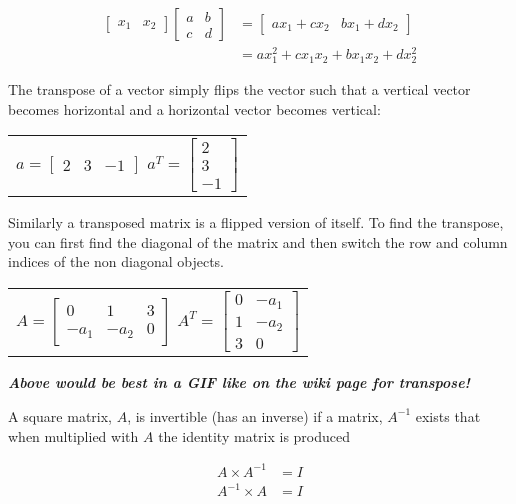\documentclass[a4paper]{article}
\begin{document}
\begin{align*}
  \begin{bmatrix}
    x_1 & x_2
  \end{bmatrix}
  \begin{bmatrix}
    a & b\\
    c & d
  \end{bmatrix} &= \begin{bmatrix}
    ax_1+cx_2 & bx_1+dx_2
  \end{bmatrix}\\
  &= ax_1^2+cx_1x_2+bx_1x_2+dx_2^2
\end{align*}

The transpose of a vector simply flips the vector such that a vertical vector becomes horizontal and a horizontal vector becomes vertical:
\begin{center}
\begin{tabular}{c}
$a = \begin{bmatrix}
      2 & 3 & -1
      \end{bmatrix}$
$a^T = \begin{bmatrix}
        2\\
        3 \\
        -1
        \end{bmatrix}$
\end{tabular}
\end{center}
Similarly a transposed matrix is a flipped version of itself. To find the transpose, you can first find the diagonal of the matrix and then switch the row and column indices of the non diagonal objects.
\begin{center}
\begin{tabular}{c}
 $A = \begin{bmatrix}
       0 & 1 & 3\\
       -a_1 & -a_2 & 0
       \end{bmatrix}$
 $ A^T = \begin{bmatrix}
         0 & -a_1\\
         1 & -a_2\\
         3 & 0
         \end{bmatrix}$
 \end{tabular}               
\end{center}

\textbf{\textit{Above would be best in a GIF like on the wiki page for transpose!}}

A square matrix, $A$, is invertible (has an inverse) if a matrix, $A^{-1}$ exists that when multiplied with $A$ the identity matrix is produced
\begin{center}
\begin{align*}
 A \times A^{-1} &= I\\
 A^{-1} \times A &= I
 \end{align*}
\end{center}
\end{document}
